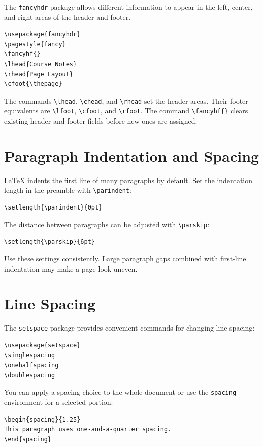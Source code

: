 \documentclass[12pt,a4paper]{article}
\begin{document}
The \texttt{fancyhdr} package allows different information to appear in the
left, center, and right areas of the header and footer.

\begin{verbatim}
\usepackage{fancyhdr}
\pagestyle{fancy}
\fancyhf{}
\lhead{Course Notes}
\rhead{Page Layout}
\cfoot{\thepage}
\end{verbatim}

The commands \verb|\lhead|, \verb|\chead|, and \verb|\rhead| set the header
areas. Their footer equivalents are \verb|\lfoot|, \verb|\cfoot|, and
\verb|\rfoot|. The command \verb|\fancyhf{}| clears existing header and footer
fields before new ones are assigned.

\section{Paragraph Indentation and Spacing}

LaTeX indents the first line of many paragraphs by default. Set the indentation
length in the preamble with \verb|\parindent|:

\begin{verbatim}
\setlength{\parindent}{0pt}
\end{verbatim}

The distance between paragraphs can be adjusted with \verb|\parskip|:

\begin{verbatim}
\setlength{\parskip}{6pt}
\end{verbatim}

Use these settings consistently. Large paragraph gaps combined with first-line
indentation may make a page look uneven.

\section{Line Spacing}

The \texttt{setspace} package provides convenient commands for changing line
spacing:

\begin{verbatim}
\usepackage{setspace}
\singlespacing
\onehalfspacing
\doublespacing
\end{verbatim}

You can apply a spacing choice to the whole document or use the
\texttt{spacing} environment for a selected portion:

\begin{verbatim}
\begin{spacing}{1.25}
This paragraph uses one-and-a-quarter spacing.
\end{spacing}
\end{verbatim}
\end{document}
